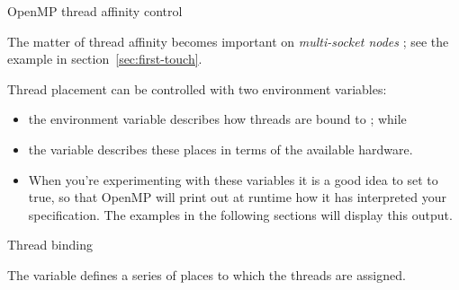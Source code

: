 

 {OpenMP thread affinity control}

The matter of thread affinity becomes important on \emph{multi-socket nodes}%
;
see the example in section~\ref{sec:first-touch}.

Thread placement can be controlled with two environment variables:
\begin{itemize}
\item the environment variable 
  describes how threads are bound to ; while
\item the variable  describes these places
  in terms of the available hardware.
\item When you're experimenting with these variables it is a good idea
  to set  to true, so that OpenMP will
  print out at runtime how it has interpreted your specification.
  The examples in the following sections will display this output.
\end{itemize}

 {Thread binding}
\label{omp:threadbind}

The variable  defines a series of places to
which the threads are assigned.

